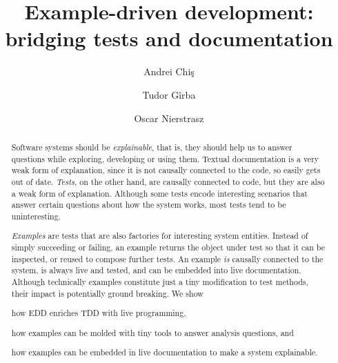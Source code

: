 \documentclass[sigplan,anonymous,review,10pt]{acmart}
\begin{document}
\title[Example-driven development: bridging tests and documentation]{Example-driven development: \\ bridging tests and documentation}
\author{Andrei Chi\c{s}}
\author{Tudor G\^irba}
\author{Oscar Nierstrasz}

\renewcommand{\shortauthors}{Chi\c{s} et al.}

\begin{abstract}
Software systems should be \emph{explainable}, that is, they should help us to answer questions while exploring, developing or using them.
Textual documentation is a very weak form of explanation, since it is not causally connected to the code, so easily gets out of date.
\emph{Tests}, on the other hand, are causally connected to code, but they are also a weak form of explanation.
Although some tests encode interesting scenarios that answer certain questions about how the system works, most tests tend to be uninteresting.

\emph{Examples} are tests that are also factories for interesting system entities.
Instead of simply succeeding or failing, an example returns the object under test so that it can be inspected, or reused to compose further tests.
An example \emph{is} causally connected to the system, is always live and tested, and can be embedded into live documentation.
Although technically examples constitute just a tiny modification to test methods, their impact is potentially ground breaking.
We show
\begin{inparaenum}[(i)]
	\item how EDD enriches TDD with live programming,
	\item how examples can be molded with tiny tools to answer analysis questions, and	\item how examples can be embedded in live documentation to make a system explainable.
\end{inparaenum}
\end{abstract}


\end{document}
